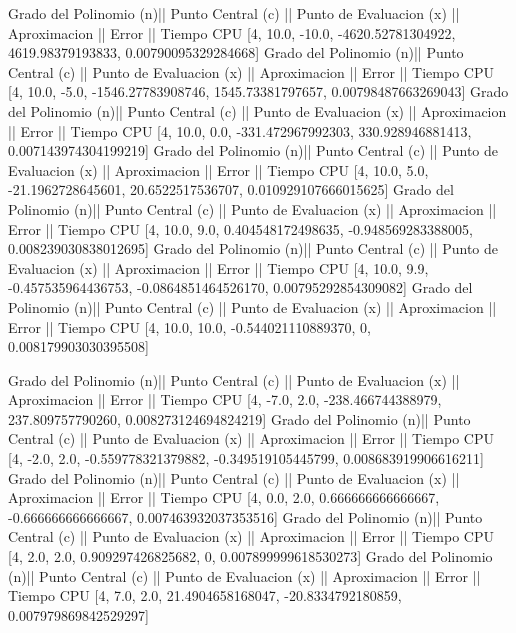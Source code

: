 Grado del Polinomio (n)|| Punto Central (c) || Punto de Evaluacion (x) || Aproximacion || Error || Tiempo CPU 
 [4, 10.0, -10.0, -4620.52781304922, 4619.98379193833, 0.00790095329284668]
Grado del Polinomio (n)|| Punto Central (c) || Punto de Evaluacion (x) || Aproximacion || Error || Tiempo CPU 
 [4, 10.0, -5.0, -1546.27783908746, 1545.73381797657, 0.00798487663269043]
Grado del Polinomio (n)|| Punto Central (c) || Punto de Evaluacion (x) || Aproximacion || Error || Tiempo CPU 
 [4, 10.0, 0.0, -331.472967992303, 330.928946881413, 0.007143974304199219]
Grado del Polinomio (n)|| Punto Central (c) || Punto de Evaluacion (x) || Aproximacion || Error || Tiempo CPU 
 [4, 10.0, 5.0, -21.1962728645601, 20.6522517536707, 0.010929107666015625]
Grado del Polinomio (n)|| Punto Central (c) || Punto de Evaluacion (x) || Aproximacion || Error || Tiempo CPU 
 [4, 10.0, 9.0, 0.404548172498635, -0.948569283388005, 0.008239030838012695]
Grado del Polinomio (n)|| Punto Central (c) || Punto de Evaluacion (x) || Aproximacion || Error || Tiempo CPU 
 [4, 10.0, 9.9, -0.457535964436753, -0.0864851464526170, 0.00795292854309082]
Grado del Polinomio (n)|| Punto Central (c) || Punto de Evaluacion (x) || Aproximacion || Error || Tiempo CPU 
 [4, 10.0, 10.0, -0.544021110889370, 0, 0.008179903030395508]

Grado del Polinomio (n)|| Punto Central (c) || Punto de Evaluacion (x) || Aproximacion || Error || Tiempo CPU 
 [4, -7.0, 2.0, -238.466744388979, 237.809757790260, 0.008273124694824219]
Grado del Polinomio (n)|| Punto Central (c) || Punto de Evaluacion (x) || Aproximacion || Error || Tiempo CPU 
 [4, -2.0, 2.0, -0.559778321379882, -0.349519105445799, 0.008683919906616211]
Grado del Polinomio (n)|| Punto Central (c) || Punto de Evaluacion (x) || Aproximacion || Error || Tiempo CPU 
 [4, 0.0, 2.0, 0.666666666666667, -0.666666666666667, 0.007463932037353516]
Grado del Polinomio (n)|| Punto Central (c) || Punto de Evaluacion (x) || Aproximacion || Error || Tiempo CPU 
 [4, 2.0, 2.0, 0.909297426825682, 0, 0.007899999618530273]
Grado del Polinomio (n)|| Punto Central (c) || Punto de Evaluacion (x) || Aproximacion || Error || Tiempo CPU 
 [4, 7.0, 2.0, 21.4904658168047, -20.8334792180859, 0.007979869842529297]

